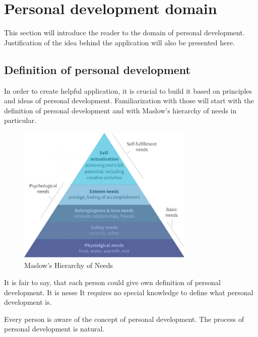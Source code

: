 
\chapter{Personal development domain}\label{ch:personal-development-domain}


This section will introduce the reader to the domain of personal development.
Justification of the idea behind the application will also be presented here.

\section{Definition of personal development}\label{sec:definition-of-personal-development}

In order to create helpful application, it is crucial to build it based on principles and ideas of personal development.
Familiarization with those will start with the definition of personal development and with Maslow's hierarchy of needs in particular.

\begin{figure}[h]
    \includegraphics[width=0.75\textwidth]{images/maslows.jpg}
    \caption{Maslow's Hierarchy of Needs~\cite{maslows}}
    \label{fig:maslows}
\end{figure}




It is fair to say, that each person could give own definition of personal development.
It is nesse
It requires no special knowledge to define what personal development is.

Every person is aware of the concept of personal development.
The process of personal development is natural.
